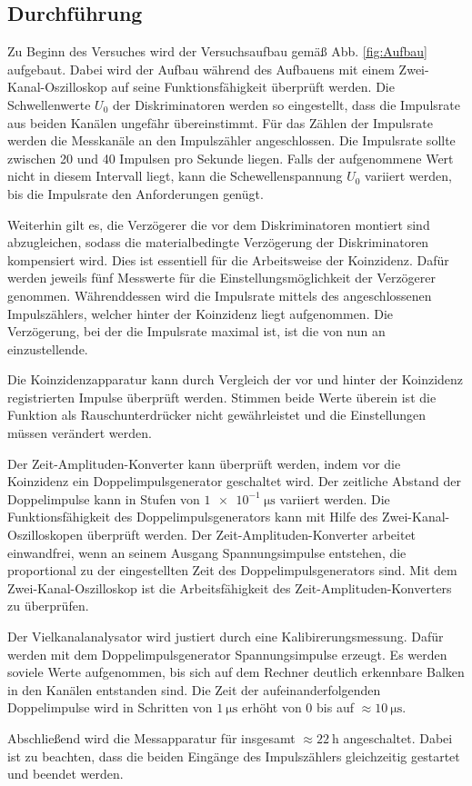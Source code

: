 \subsection{Durchführung}

Zu Beginn des Versuches wird der Versuchsaufbau gemäß Abb. \ref{fig:Aufbau} aufgebaut.
Dabei wird der Aufbau während des Aufbauens mit einem Zwei-Kanal-Oszilloskop
auf seine Funktionsfähigkeit überprüft werden.
Die Schwellenwerte $U_0$ der Diskriminatoren werden so eingestellt, dass
die Impulsrate aus beiden Kanälen ungefähr übereinstimmt. Für das Zählen der
Impulsrate werden die Messkanäle an den Impulszähler angeschlossen.
Die Impulsrate sollte zwischen 20 und 40 Impulsen pro Sekunde liegen.
Falls der aufgenommene Wert nicht in diesem Intervall liegt, kann die
Schewellenspannung $U_0$ variiert werden, bis die Impulsrate den Anforderungen genügt.

Weiterhin gilt es, die Verzögerer die vor dem Diskriminatoren montiert sind
abzugleichen, sodass die materialbedingte Verzögerung der Diskriminatoren
kompensiert wird. Dies ist essentiell für die Arbeitsweise der Koinzidenz.
Dafür werden jeweils fünf Messwerte für die Einstellungsmöglichkeit der Verzögerer genommen.
Währenddessen wird die Impulsrate mittels des angeschlossenen Impulszählers, welcher hinter
der Koinzidenz liegt aufgenommen.
Die Verzögerung, bei der die Impulsrate maximal ist, ist die von nun an einzustellende.

Die Koinzidenzapparatur kann durch Vergleich der vor und hinter der Koinzidenz
registrierten Impulse überprüft werden. Stimmen beide Werte überein ist
die Funktion als Rauschunterdrücker nicht gewährleistet und die Einstellungen müssen
verändert werden.

Der Zeit-Amplituden-Konverter kann überprüft werden, indem vor die Koinzidenz ein
Doppelimpulsgenerator geschaltet wird. Der zeitliche Abstand der
Doppelimpulse kann in Stufen von $\SI{1e-1}{\micro\second}$ variiert werden.
Die Funktionsfähigkeit des Doppelimpulsgenerators kann mit Hilfe des
Zwei-Kanal-Oszilloskopen überprüft werden.
Der Zeit-Amplituden-Konverter arbeitet einwandfrei, wenn an seinem
Ausgang Spannungsimpulse entstehen, die proportional zu der
eingestellten Zeit des Doppelimpulsgenerators sind. Mit dem Zwei-Kanal-Oszilloskop
ist die Arbeitsfähigkeit des Zeit-Amplituden-Konverters zu überprüfen.

Der Vielkanalanalysator wird justiert durch eine Kalibirerungsmessung.
Dafür werden mit dem Doppelimpulsgenerator Spannungsimpulse erzeugt.
Es werden soviele Werte aufgenommen, bis sich auf dem Rechner deutlich
erkennbare Balken in den Kanälen entstanden sind.
Die Zeit der aufeinanderfolgenden Doppelimpulse wird in Schritten von $\SI{1}{\micro\second}$
erhöht von 0 bis auf $\approx \SI{10}{\micro\second}$.

Abschließend wird die Messapparatur für insgesamt $\approx \SI{22}{\hour}$
angeschaltet. Dabei ist zu beachten, dass die beiden Eingänge des Impulszählers
gleichzeitig gestartet und beendet werden.
